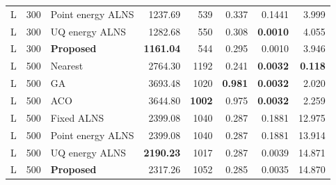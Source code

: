 \begin{longtable}{@{}rrlrrrrr@{}}
L & 300 & Point energy ALNS & 1237.69 & 539 & 0.337 & 0.1441 & 3.999 \\

L & 300 & UQ energy ALNS & 1282.68 & 550 & 0.308 & \textbf{0.0010} & 4.055 \\
\rowcolor{gray!10}
L & 300 & \textbf{Proposed} & \textbf{1161.04} & 544 & 0.295 & 0.0010 & 3.946 \\
\addlinespace[2pt]

L & 500 & Nearest & 2764.30 & 1192 & 0.241 & \textbf{0.0032} & \textbf{0.118} \\

L & 500 & GA & 3693.48 & 1020 & \textbf{0.981} & \textbf{0.0032} & 2.020 \\

L & 500 & ACO & 3644.80 & \textbf{1002} & 0.975 & \textbf{0.0032} & 2.259 \\

L & 500 & Fixed ALNS & 2399.08 & 1040 & 0.287 & 0.1881 & 12.975 \\

L & 500 & Point energy ALNS & 2399.08 & 1040 & 0.287 & 0.1881 & 13.914 \\

L & 500 & UQ energy ALNS & \textbf{2190.23} & 1017 & 0.287 & 0.0039 & 14.871 \\
\rowcolor{gray!10}
L & 500 & \textbf{Proposed} & 2317.26 & 1052 & 0.285 & 0.0035 & 14.870 \\
\bottomrule
\end{longtable}
\endgroup
